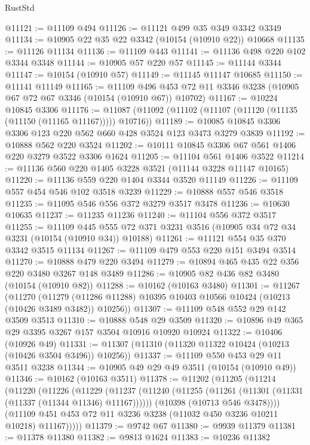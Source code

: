 \begin{lexlean}{RustStd}
\begin{coremodule}
{\begin{coremodule}
{{{{{{{{{{{{{{{{{{{{{{{{{{@11121 := @11109 @494
@11126 := @11121 @499 @35 @349 @3342 @3349
@11134 := @10905 @22 @35 @22 @3342 (@10154 (@10910 @22)) @10668
@11135 := @11126 @11134
@11136 := @11109 @443
@11141 := @11136 @498 @220 @102 @3344 @3348
@11144 := @10905 @57 @220 @57
@11145 := @11144 @3344
@11147 := @10154 (@10910 @57)
@11149 := @11145 @11147 @10685
@11150 := @11141 @11149
@11165 := @11109
    @496
    @453
    @72
    @11
    @3346
    @3238
    (@10905 @67 @72 @67 @3346 (@10154 (@10910 @67)) @10702)
@11167 := @10224 @10845 @3306
@11176 := @11087 (@11092 (@11102 (@11107 (@11120 (@11135 (@11150 (@11165 @11167))))) @10716))
@11189 := @10085 @10845 @3306 @3306 @123 @220 @562 @660 @428 @3524 @123 @3473 @3279 @3839
@11192 := @10888 @562 @220 @3524
@11202 := @10111 @10845 @3306 @67 @561 @1406 @220 @3279 @3522 @3306 @1624
@11205 := @11104 @561 @1406 @3522
@11214 := @11136 @560 @220 @1405 @3228 @3521 (@11144 @3228 @11147 @10165)
@11220 := @11136 @559 @220 @1404 @3344 @3520 @11149
@11226 := @11109 @557 @454 @546 @102 @3518 @3239
@11229 := @10888 @557 @546 @3518
@11235 := @11095 @546 @556 @372 @3279 @3517 @3478
@11236 := @10630 @10635
@11237 := @11235 @11236
@11240 := @11104 @556 @372 @3517
@11255 := @11109
    @445
    @555
    @72
    @371
    @3231
    @3516
    (@10905 @34 @72 @34 @3231 (@10154 (@10910 @34)) @10188)
@11261 := @11121 @554 @35 @370 @3342 @3515 @11134
@11267 := @11109 @479 @553 @220 @151 @3494 @3514
@11270 := @10888 @479 @220 @3494
@11279 := @10894 @465 @435 @22 @356 @220 @3480 @3267 @148 @3489
@11286 := @10905 @82 @436 @82 @3480 (@10154 (@10910 @82))
@11288 := @10162 (@10163 @3480)
@11301 := @11267
    (@11270
      (@11279 (@11286 @11288) @10395 @10403 @10566 @10424 (@10213 (@10426 @3489 @3482)) @10256))
@11307 := @11109 @548 @552 @29 @142 @3509 @3513
@11310 := @10888 @548 @29 @3509
@11320 := @10896 @49 @365 @29 @3395 @3267 @157 @3504 @10916 @10920 @10924
@11322 := @10406 (@10926 @49)
@11331 := @11307 (@11310 (@11320 @11322 @10424 (@10213 (@10426 @3504 @3496)) @10256))
@11337 := @11109 @550 @453 @29 @11 @3511 @3238
@11344 := @10905 @49 @29 @49 @3511 (@10154 (@10910 @49))
@11346 := @10162 (@10163 @3511)
@11378 := @11202
    (@11205
      (@11214
        (@11220
          (@11226
            (@11229
              (@11237
                (@11240 (@11255 (@11261 (@11301 (@11331 (@11337 (@11344 @11346) @11167))))))
                (@10398 (@10713 @546 @3478))))
            (@11109 @451 @453 @72 @11 @3236 @3238 (@11032 @450 @3236 @10211 @10218) @11167)))))
@11379 := @9742 @67
@11380 := @9939 @11379
@11381 := @11378 @11380
@11382 := @9813 @1624
@11383 := @10236 @11382
}}}}}}}}}}}}}}}}}}}}}}}}}}
\end{coremodule}}
\end{coremodule}
\end{lexlean}
